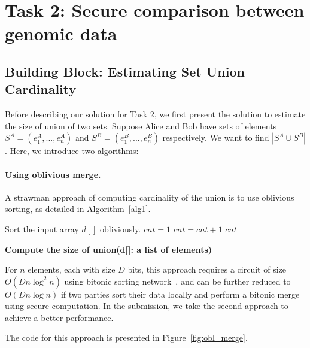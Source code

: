 \section{Task 2: Secure comparison between genomic data}
\subsection{Building Block: Estimating Set Union Cardinality}
Before describing our solution for Task 2, we first present the solution to estimate the size of union of two sets.
Suppose Alice and Bob have sets of elements $S^A = (e^A_1,...,e^A_n)$
and $S^B = (e^B_1,...,e^B_n)$ respectively. We want to find $|S^A\cup S^B|$. Here, we introduce two algorithms:

\paragraph{Using oblivious merge.}
A strawman approach of computing cardinality of the union is to use oblivious sorting, as detailed in Algorithm~\ref{alg1}.

\begin{algorithm}
\begin{algorithmic}[1]
\State Sort the input array $d[]$ obliviously.
\State $cnt = 1$
		\State $cnt = cnt + 1$
	\EndIf
\EndFor
\State\Return $cnt$
\end{algorithmic}
\caption{\textbf{Compute the size of union(d[]: a list of elements)}} %
\label{alg1}
\end{algorithm}
For $n$ elements, each with size $D$ bits, this approach requires a circuit of size $O(Dn\log^2n)$ using bitonic sorting network~\cite{bitonicsort},
and can be further reduced to $O(Dn\log n)$ if two parties sort their data locally and perform a bitonic merge using secure computation.
In the submission, we take the second approach to achieve a better performance.



The code for this approach is presented in Figure~\ref{fig:obl_merge}.


